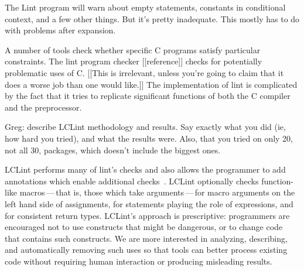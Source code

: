 \documentclass[10pt]{article}
\begin{document}
The Lint program will warn about empty statements, constants in conditional
context, and a few other things.  But it's pretty inadequate.  This mostly
has to do with problems after expansion.

A number of tools check whether specific C programs satisfy particular
constraints.  The lint program checker [[reference]]
checks for potentially problematic uses of C\@.  
[[This is irrelevant, unless you're going to claim that it does a worse job
than one would like.]]
The implementation of lint
is complicated by the fact that it tries to replicate significant functions
of both the C compiler and the preprocessor.


Greg:  describe LCLint methodology and results.  Say exactly what you did
(ie, how hard you tried), and what the results were.  Also, that you tried
on only 20, not all 30, packages, which doesn't include the biggest ones.


LCLint performs many of lint's checks and also
allows the programmer to add annotations which enable additional
checks~\cite{Evans-pldi96,Evans-fse94}.
LCLint optionally checks function-like
macros\,---\,that is, those which take arguments\,---\,for
macro arguments on the left hand side of assignments, for statements
playing the role of expressions, and for consistent return types.
LCLint's approach is prescriptive: programmers are encouraged not to use
constructs that might be dangerous, or to change code that contains such
constructs.  We are more interested in analyzing, describing, and
automatically removing such uses so that tools can better process existing
code without requiring human interaction or producing misleading results.
\end{document}
